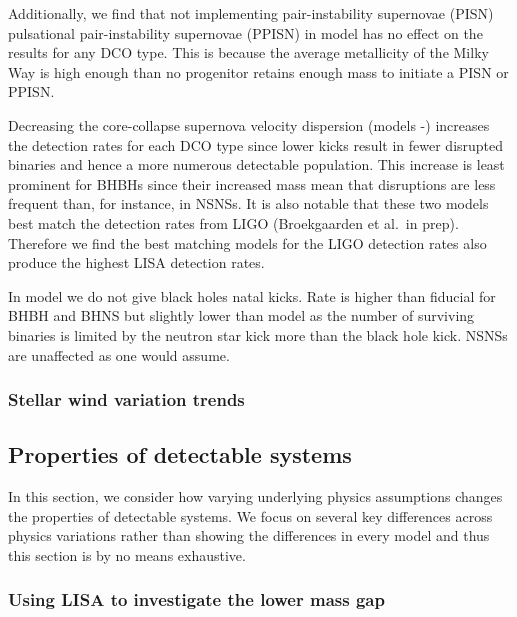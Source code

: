 Additionally, we find that not implementing pair-instability supernovae (PISN) pulsational pair-instability supernovae (PPISN) in model \modNoPISN{} has no effect on the results for any DCO type. This is because the average metallicity of the Milky Way is high enough than no progenitor retains enough mass to initiate a PISN or PPISN.

Decreasing the core-collapse supernova velocity dispersion (models \modSigLow{}-\modSigLower{}) increases the detection rates for each DCO type since lower kicks result in fewer disrupted binaries and hence a more numerous detectable population. This increase is least prominent for BHBHs since their increased mass mean that disruptions are less frequent than, for instance, in NSNSs. It is also notable that these two models best match the detection rates from LIGO (Broekgaarden et al.\ in prep). Therefore we find the best matching models for the LIGO detection rates also produce the highest LISA detection rates.

 In model \modNoBH{} we do not give black holes natal kicks. Rate is higher than fiducial for BHBH and BHNS but slightly lower than model \modSigLower{} as the number of surviving binaries is limited by the neutron star kick more than the black hole kick. NSNSs are unaffected as one would assume.

\subsubsection{Stellar wind variation trends}


\subsection{Properties of detectable systems}\label{sec:property_variations}

In this section, we consider how varying underlying physics assumptions changes the properties of detectable systems. We focus on several key differences across physics variations rather than showing the differences in every model and thus this section is by no means exhaustive.

\subsubsection{Using LISA to investigate the lower mass gap}

